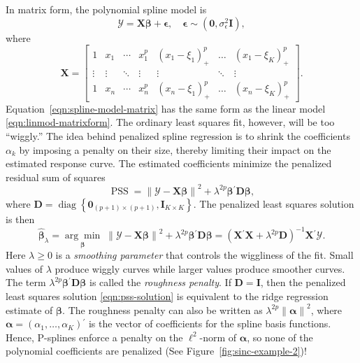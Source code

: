 \documentclass[cmfont,usenames,dvipsnames,leqno]{afit-etd}\usepackage[]{graphicx}\usepackage[]{color}
\newcommand{\norm}[1]{\left\|#1\right\|}
\newcommand{\trans}{\ensuremath{^\prime}}
\newcommand{\bc}[1]{\ensuremath{\bm{\mathcal{#1}}}}
\newcommand{\wh}[1]{\ensuremath{\widehat{#1}}}
\newcommand{\argmin}[1]{\underset{#1}{\operatorname{arg}\!\operatorname{min}}\;}
\newcommand{\diag}{\operatorname{diag}}
\newcommand{\PSS}{\operatorname{PSS}}
\newcommand{\X}{\ensuremath{\bm{X}}}
\begin{document}
In matrix form, the polynomial spline model is
\begin{equation}
\label{eqn:spline-model-matrix}
  \bc{Y} = \X\bm{\beta} + \bm{\epsilon}, \quad \bm{\epsilon} \sim (\bm{0}, \sigma_\epsilon^2\bm{I}),
\end{equation}
where 
\begin{equation*}
  \X = 
    \begin{bmatrix}
      1 & x_1 & \cdots & x_1^p & (x_1-\xi_1)_+^p & \dotsc & (x_1-\xi_K)_+^p \\  
      \vdots & \vdots & \ddots & \vdots & \vdots & \ddots & \vdots \\
      1 & x_n & \cdots & x_n^p & (x_n-\xi_1)_+^p & \dotsc & (x_n-\xi_K)_+^p
    \end{bmatrix}.              
\end{equation*}
Equation~\eqref{eqn:spline-model-matrix} has the same form as the linear model \eqref{eqn:linmod-matrixform}. The ordinary least squares fit, however, will be too ``wiggly.'' The idea behind penalized spline regression is to shrink the coefficients $\alpha_k$ by imposing a penalty on their size, thereby limiting their impact on the estimated response curve. The estimated coefficients minimize the penalized residual sum of squares
\begin{equation}
\label{eqn:pss}
  \PSS = \norm{\bc{Y} - \X\bm{\beta}}^2 + \lambda^{2p}\bm{\beta}\trans\bm{D}\bm{\beta},
\end{equation}
where $\bm{D} = \diag\left\{\bm{0}_{(p+1) \times (p+1)}, \bm{I}_{K \times K}\right\}$. The penalized least squares solution is then
\begin{equation}
\label{eqn:pss-solution}
  \wh{\bm{\beta}}_\lambda = \argmin{\bm{\beta}} \norm{\bc{Y} - \X\bm{\beta}}^2 + \lambda^{2p}\bm{\beta}\trans\bm{D}\bm{\beta} = \left( \X\trans\X + \lambda^{2p}\bm{D} \right)^{-1}\X\trans\bc{Y}.
\end{equation}
Here $\lambda \ge 0$ is a \textit{smoothing parameter} that controls the wiggliness of the fit. Small values of $\lambda$ produce wiggly curves while larger values  produce smoother curves. The term $\lambda^{2p}\bm{\beta}\trans\bm{D}\bm{\beta}$ is called the \textit{roughness penalty}. If $\bm{D} = \bm{I}$, then the penalized least squares solution \eqref{eqn:pss-solution} is equivalent to the ridge regression estimate of $\bm{\beta}$. The roughness penalty can also be written as $\lambda^{2p}\norm{\bm{\alpha}}^2$, where $\bm{\alpha} = (\alpha_1, \dotsc, \alpha_K)\trans$ is the vector of coefficients for the spline basis functions. Hence, \acp{P-spline} enforce a penalty on the $\ell^2$-norm of $\bm{\alpha}$, so none of the polynomial coefficients are penalized (See Figure~\ref{fig:sinc-example-2})! 
\end{document}
